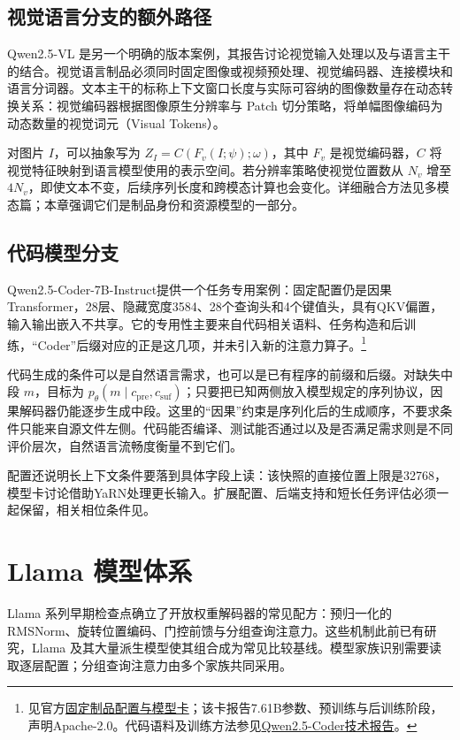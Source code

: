 \documentclass[../textbook.tex]{subfiles}
\begin{document}
\subsection{视觉语言分支的额外路径}
Qwen2.5-VL 是另一个明确的版本案例，其报告讨论视觉输入处理以及与语言主干的结合\cite{qwen2025vl}。视觉语言制品必须同时固定图像或视频预处理、视觉编码器、连接模块和语言分词器。文本主干的标称上下文窗口长度与实际可容纳的图像数量存在动态转换关系：视觉编码器根据图像原生分辨率与 Patch 切分策略，将单幅图像编码为动态数量的视觉词元（Visual Tokens）。

对图片 $I$，可以抽象写为 $Z_I=C(F_v(I;\psi);\omega)$，其中 $F_v$ 是视觉编码器，$C$ 将视觉特征映射到语言模型使用的表示空间。若分辨率策略使视觉位置数从 $N_v$ 增至 $4N_v$，即使文本不变，后续序列长度和跨模态计算也会变化。详细融合方法见多模态篇；本章强调它们是制品身份和资源模型的一部分。

\subsection{代码模型分支}
Qwen2.5-Coder-7B-Instruct提供一个任务专用案例：固定配置仍是因果Transformer，28层、隐藏宽度3584、28个查询头和4个键值头，具有QKV偏置，输入输出嵌入不共享。它的专用性主要来自代码相关语料、任务构造和后训练，“Coder”后缀对应的正是这几项，并未引入新的注意力算子。\footnote{见官方\href{https://huggingface.co/Qwen/Qwen2.5-Coder-7B-Instruct/tree/c03e6d358207e414f1eca0bb1891e29f1db0e242}{固定制品配置与模型卡}；该卡报告7.61B参数、预训练与后训练阶段，声明Apache-2.0。代码语料及训练方法参见\href{https://arxiv.org/abs/2409.12186}{Qwen2.5-Coder技术报告}。}

代码生成的条件可以是自然语言需求，也可以是已有程序的前缀和后缀。对缺失中段 $m$，目标为 $p_\theta(m\mid c_{\mathrm{pre}},c_{\mathrm{suf}})$；只要把已知两侧放入模型规定的序列协议，因果解码器仍能逐步生成中段。这里的“因果”约束是序列化后的生成顺序，不要求条件只能来自源文件左侧。代码能否编译、测试能否通过以及是否满足需求则是不同评价层次，自然语言流畅度衡量不到它们。

配置还说明长上下文条件要落到具体字段上读：该快照的直接位置上限是32768，模型卡讨论借助YaRN处理更长输入。扩展配置、后端支持和短长任务评估必须一起保留，相关相位条件见。

\section{Llama 模型体系}
Llama 系列早期检查点确立了开放权重解码器的常见配方：预归一化的 RMSNorm、旋转位置编码、门控前馈与分组查询注意力。这些机制此前已有研究，Llama 及其大量派生模型使其组合成为常见比较基线。模型家族识别需要读取逐层配置；分组查询注意力由多个家族共同采用。
\end{document}
